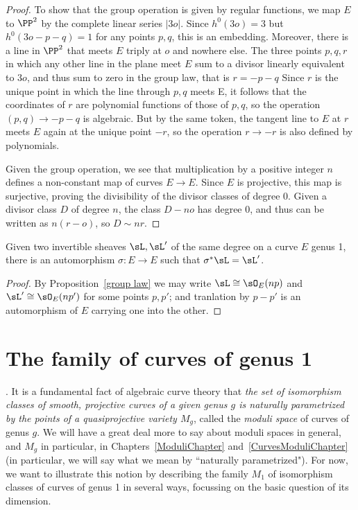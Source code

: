  
\begin{proof}
To show that the group operation is given by regular functions, we map $E$ to $\PP^2$ by the complete linear series $|3o|$. Since
$h^0(3o) = 3$ but $h^0(3o-p-q) = 1$ for any points $p,q$, this is an embedding. Moreover, there is a line in $\PP^2$ that meets
$E$ triply at $o$ and nowhere else. The three points $p,q,r$ in which any other line in the plane
meet $E$ sum to a divisor linearly equivalent to $3o$, and thus sum to zero in the group law, that is $r = -p-q$ Since $r$ is the unique
point in which the line
through $p,q$ meets  E, it follows that the coordinates of $r$ are polynomial functions of those of $p,q$, so the operation
$(p,q) \to -p-q$ is algebraic. But by the same token, the tangent line to $E$ at $r$ meets $E$ again at the unique point $-r$,
so the operation $r\to -r$ is also defined by polynomials.

Given the group operation, we see that multiplication by a positive integer $n$ defines a non-constant map of 
curves $E\to E$. Since $E$ is projective, this map is surjective, proving the divisibility of the divisor classes of degree 0. 
Given a divisor class $D$ of degree $n$, the class $D -no$ has degree 0, and thus can be written as $n(r-o)$, so
$D\sim nr$.
\end{proof}

\begin{corollary}\label{equivalence of sheaves}
Given two invertible sheaves $\sL, \sL'$ of the same degree on a curve $E$ genus 1, there is an automorphism $\sigma: E\to E$
such that $\sigma^*\sL = \sL'$.
\end{corollary}

\begin{proof}
By Proposition~\ref{group law} we may write $\sL \cong \sO_E(np)$ and $\sL'\cong \sO_E(np')$ for some points $p,p'$; and tranlation by $p-p'$
is an automorphism of $E$ carrying one into the other.
\end{proof}


\section{The family of curves of genus 1}. It is a fundamental fact of algebraic curve theory that \emph{the set of isomorphism classes of smooth, projective curves of a given genus $g$ is naturally parametrized by the points of a quasiprojective variety $M_g$}, called the \emph{moduli space} of curves of genus $g$. We will have a great deal more to say about moduli spaces in general, and $M_g$ in particular, in Chapters~\ref{ModuliChapter} and~\ref{CurvesModuliChapter} (in particular, we will say what we mean by ``naturally parametrized"). For now, we want to illustrate this notion by describing the family $M_1$ of isomorphism classes of curves of genus 1 in several ways, focussing on the basic question of its dimension.



